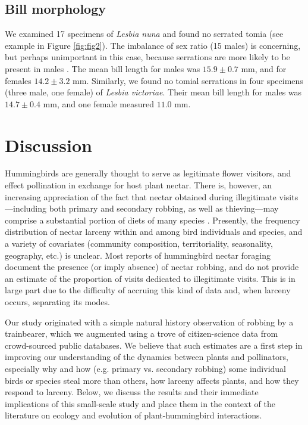 \documentclass[fleqn,10pt,lineno]{wlpeerj}
\begin{document}
\subsection*{Bill morphology}
We examined 17 specimens of \textit{Lesbia nuna} and found no serrated tomia (see example in Figure \ref{fig:fig2}). 
The imbalance of sex ratio (15 males) is concerning, but perhaps unimportant in this case, because serrations are more likely to be present in males \citep{rico-guevara2019}. 
The mean bill length for males was $15.9 \pm 0.7$ mm, and for females $14.2 \pm 3.2$ mm. Similarly, we found no tomial serrations in four specimens (three male, one female) of \textit{Lesbia victoriae}. 
Their mean bill length for males was $14.7 \pm 0.4$ mm, and one female measured $11.0$ mm.


\section*{Discussion}

%
%
Hummingbirds are generally thought to serve as legitimate flower visitors, and effect pollination in exchange for host plant nectar. 
There is, however, an increasing appreciation of the fact that nectar obtained during illegitimate visits---including both primary and secondary robbing, as well as thieving---may comprise a substantial portion of diets of many species \citep{lara2001,irwin2010,boehm2018}. 
Presently, the frequency distribution of nectar larceny within and among bird individuals and species, and a variety of covariates (community composition, territoriality, seasonality, geography, etc.) is unclear. 
Most reports of hummingbird nectar foraging document the presence (or imply absence) of nectar robbing, and do not provide an estimate of the proportion of visits dedicated to illegitimate visits. 
This is in large part due to the difficulty of accruing this kind of data and, when larceny occurs, separating its modes.  

%
%
Our study originated with a simple natural history observation of robbing by a trainbearer, which we  augmented using a trove of citizen-science data from crowd-sourced public databases. We believe that such estimates are a first step in improving our understanding of the dynamics between plants and pollinators, especially why and how (e.g. primary vs. secondary robbing) some individual birds or species steal more than others, how larceny affects plants, and how they respond to larceny. Below, we discuss the results and their immediate implications of this small-scale study and place them in the context of the literature on ecology and evolution of plant-hummingbird interactions.
\end{document}
